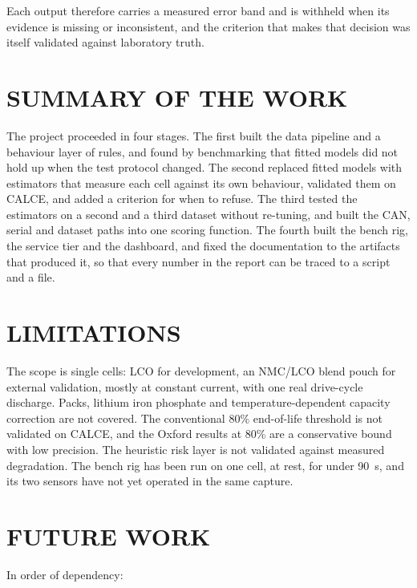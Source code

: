 \documentclass[12pt,a4paper]{amritareport}
\begin{document}
Each output therefore carries a measured error band and is withheld when its evidence is missing or inconsistent, and the criterion that makes that decision was itself validated against laboratory truth.

\section{SUMMARY OF THE WORK}

The project proceeded in four stages. The first built the data pipeline and a behaviour layer of rules, and found by benchmarking that fitted models did not hold up when the test protocol changed. The second replaced fitted models with estimators that measure each cell against its own behaviour, validated them on CALCE, and added a criterion for when to refuse. The third tested the estimators on a second and a third dataset without re-tuning, and built the CAN, serial and dataset paths into one scoring function. The fourth built the bench rig, the service tier and the dashboard, and fixed the documentation to the artifacts that produced it, so that every number in the report can be traced to a script and a file.

\section{LIMITATIONS}

The scope is single cells: LCO for development, an NMC/LCO blend pouch for external validation, mostly at constant current, with one real drive-cycle discharge. Packs, lithium iron phosphate and temperature-dependent capacity correction are not covered. The conventional 80\% end-of-life threshold is not validated on CALCE, and the Oxford results at 80\% are a conservative bound with low precision. The heuristic risk layer is not validated against measured degradation. The bench rig has been run on one cell, at rest, for under 90~s, and its two sensors have not yet operated in the same capture.

\section{FUTURE WORK}

In order of dependency:
\end{document}
